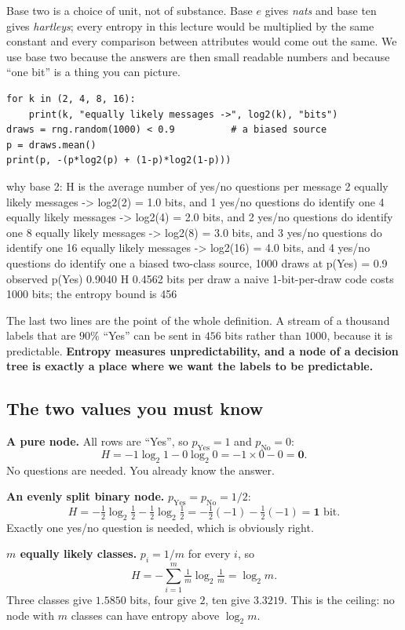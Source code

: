 \documentclass[11pt]{article}
\begin{document}
Base two is a choice of unit, not of substance. Base $e$ gives \emph{nats} and
base ten gives \emph{hartleys}; every entropy in this lecture would be
multiplied by the same constant and every comparison between attributes would
come out the same. We use base two because the answers are then small readable
numbers and because ``one bit'' is a thing you can picture.

\begin{lstlisting}
for k in (2, 4, 8, 16):
    print(k, "equally likely messages ->", log2(k), "bits")
draws = rng.random(1000) < 0.9          # a biased source
p = draws.mean()
print(p, -(p*log2(p) + (1-p)*log2(1-p)))
\end{lstlisting}
\begin{codeout}
why base 2: H is the average number of yes/no questions per message
    2 equally likely messages -> log2(2) = 1.0 bits, and 1 yes/no questions do identify one
    4 equally likely messages -> log2(4) = 2.0 bits, and 2 yes/no questions do identify one
    8 equally likely messages -> log2(8) = 3.0 bits, and 3 yes/no questions do identify one
   16 equally likely messages -> log2(16) = 4.0 bits, and 4 yes/no questions do identify one
a biased two-class source, 1000 draws at p(Yes) = 0.9
   observed p(Yes) 0.9040   H 0.4562 bits per draw
   a naive 1-bit-per-draw code costs 1000 bits; the entropy bound is 456
\end{codeout}

The last two lines are the point of the whole definition. A stream of a
thousand labels that are $90\%$ ``Yes'' can be sent in $456$ bits rather than
$1000$, because it is predictable. \textbf{Entropy measures unpredictability,
and a node of a decision tree is exactly a place where we want the labels to be
predictable.}

\subsection{The two values you must know}

\begin{worked}
\textbf{A pure node.} All rows are ``Yes'', so $p_{\text{Yes}} = 1$ and
$p_{\text{No}} = 0$:
\[
  H = -1\log_2 1 - 0\log_2 0 = -1 \times 0 - 0 = \mathbf{0}.
\]
No questions are needed. You already know the answer.

\textbf{An evenly split binary node.} $p_{\text{Yes}} = p_{\text{No}} = 1/2$:
\[
  H = -\tfrac12 \log_2 \tfrac12 - \tfrac12 \log_2 \tfrac12
    = -\tfrac12(-1) - \tfrac12(-1) = \mathbf{1} \text{ bit}.
\]
Exactly one yes/no question is needed, which is obviously right.

\textbf{$m$ equally likely classes.} $p_i = 1/m$ for every $i$, so
\[
  H = -\sum_{i=1}^m \tfrac1m \log_2 \tfrac1m = \log_2 m .
\]
Three classes give $1.5850$ bits, four give $2$, ten give $3.3219$. This is the
ceiling: no node with $m$ classes can have entropy above $\log_2 m$.
\end{worked}
\end{document}
